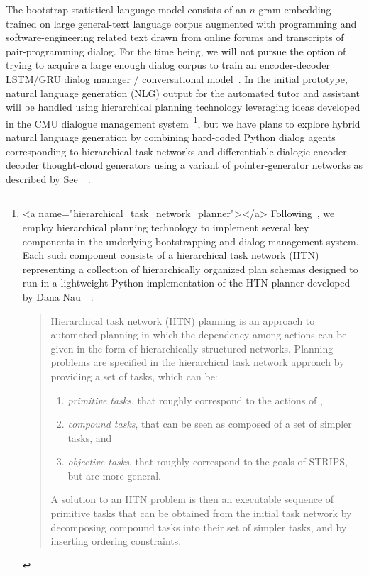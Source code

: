 The bootstrap statistical language model consists of an $n$-gram embedding trained on large general-text language corpus augmented with programming and software-engineering related text drawn from online forums and transcripts of pair-programming dialog. For the time being, we will not pursue the option of trying to acquire a large enough dialog corpus to train an encoder-decoder LSTM/GRU dialog manager / conversational model~\cite{VinyalsandLeICML-15}. In the initial prototype, natural language generation (NLG) output for the automated tutor and assistant will be handled using hierarchical planning technology leveraging ideas developed in the CMU {} dialogue management system~\cite{BohusandRudnickyCS-09}\footnote{%
%
  \rawhtml
  <a name="hierarchical_task_network_planner"></a>
  \endrawhtml
%
  Following~\cite{DeanDIACRITICAL-14,BohusandRudnickyCS-09}, we employ hierarchical planning technology to implement several key components in the underlying bootstrapping and dialog management system. Each such component consists of a hierarchical task network (HTN) representing a collection of hierarchically organized plan schemas designed to run in a lightweight Python implementation of the HTN planner developed by Dana Nau~\etal{}~\cite{NauetalJAIR-03}:
%
  \begin{quotation}
%
    Hierarchical task network (HTN) planning is an approach to automated planning in which the dependency among actions can be given in the form of hierarchically structured networks. Planning problems are specified in the hierarchical task network approach by providing a set of tasks, which can be:
%
    \begin{enumerate}
%
    \item {\it{primitive tasks}}, that roughly correspond to the actions of {},
%
    \item {\it{compound tasks}}, that can be seen as composed of a set of simpler tasks, and
%
    \item {\it{objective tasks}}, that roughly correspond to the goals of STRIPS, but are more general.
%
    \end{enumerate}
                
    A solution to an HTN problem is then an executable sequence of primitive tasks that can be obtained from the initial task network by decomposing compound tasks into their set of simpler tasks, and by inserting ordering constraints. {}
%
  \end{quotation}},
%
but we have plans to explore hybrid natural language generation by combining hard-coded Python dialog agents corresponding to hierarchical task networks and differentiable dialogic encoder-decoder thought-cloud generators using a variant of pointer-generator networks as described by See~\etal{}~\cite{SeeetalACL-17}.

